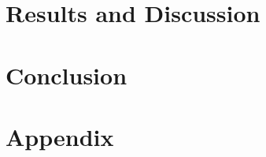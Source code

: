 \documentclass[twoside,11pt]{report}
\begin{document}




\section{Results and Discussion}
\label{sec:resultsdiscussion}











\section{Conclusion}
\label{sec:conclusion}


























%
%
\newpage
\appendix
{}%
\section*{Appendix}
\label{app:appendix}
\end{document}
